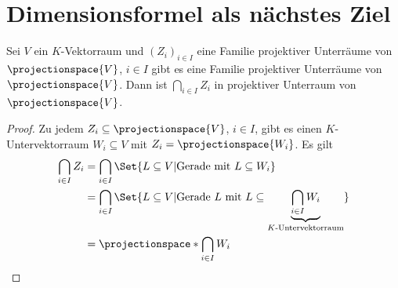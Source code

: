 \section*{Dimensionsformel als nächstes Ziel}
\begin{lemma}
  Sei \( V \) ein \( K \)-Vektorraum und \( (Z_i)_{i\in I} \) eine Familie projektiver Unterräume von \( \projectionspace{V} \), \( i\in I \) gibt es eine Familie projektiver Unterräume von \( \projectionspace{V} \). Dann ist \( \bigcap_{i\in I} Z_i \) in projektiver Unterraum von \( \projectionspace{V} \).
\end{lemma}
\begin{proof}
  Zu jedem \( Z_i\subseteq \projectionspace{V} \), \( i\in I \), gibt es einen \( K \)-Untervektorraum \( W_i\subseteq V \) mit \( Z_i=\projectionspace{W_i} \). Es gilt
  \begin{equation*}
    \begin{split}
      \bigcap_{i\in I}Z_i&=\bigcap_{i\in I}\Set{L\subseteq V|\text{Gerade mit \( L\subseteq W_i \)}}\\
      &=\bigcap_{i\in I}\Set{L\subseteq V|\text{Gerade \( L \) mit \( L\subseteq  \underbrace{\bigcap_{i\in I}W_i}_{\text{\( K \)-Untervektorraum}}\)}}\\
      &=\projectionspace*{\bigcap_{i\in I} W_i}
    \end{split}
  \end{equation*}
\end{proof}
\addtocounter{beispiel}{-1}

